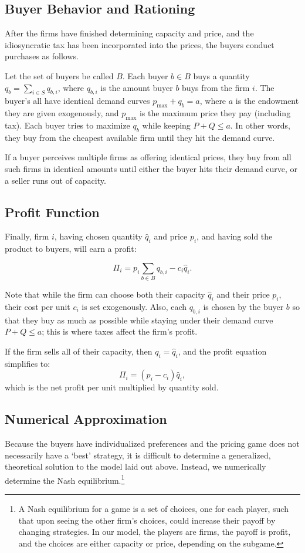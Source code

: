 \documentclass[11pt]{article}
\begin{document}
\subsection{Buyer Behavior and Rationing}
After the firms have finished determining capacity and price, and the
idiosyncratic tax has been incorporated into the prices, the buyers conduct
purchases as follows.

Let the set of buyers be called $B$. Each buyer $b\in B$ buys a quantity $q_b =
\sum_{i\in S} q_{b,i}$, where $q_{b,i}$ is the amount buyer $b$ buys from the
firm $i$. The buyer's all have identical demand curves $p_\text{max} + q_b =
a$, where $a$ is the endowment they are given exogenously, and $p_\text{max}$
is the maximum price they pay (including tax). Each buyer tries to maximize
$q_b$ while keeping $P + Q \le a$. In other words, they buy from the cheapest
available firm until they hit the demand curve.

If a buyer perceives multiple firms as offering identical prices, they buy from
all such firms in identical amounts until either the buyer hits their demand
curve, or a seller runs out of capacity. 

\subsection{Profit Function}
Finally, firm $i$, having chosen quantity $\hat q_i$ and price $p_i$, and
having sold the product to buyers, will earn a profit:

\begin{equation}
    \Pi_i = p_i\sum_{b\in B} q_{b,i} - c_i\hat q_i.
\end{equation}

Note that while the firm can choose both their capacity $\hat q_i$ and their
price $p_i$, their cost per unit $c_i$ is set exogenously. Also, each $q_{b,i}$
is chosen by the buyer $b$ so that they buy as much as possible while staying
under their demand curve $P+Q\leq a$; this is where taxes affect the firm's
profit.

If the firm sells all of their capacity, then $q_i = \hat q_i$, and the profit
equation simplifies to:
\begin{equation}
    \Pi_i = (p_i- c_i)\hat q_i,
\end{equation}
which is the net profit per unit multiplied by quantity sold.

\subsection{Numerical Approximation}
Because the buyers have individualized preferences and the pricing game does
not necessarily have a `best' strategy, it is difficult to determine a
generalized, theoretical solution to the model laid out above. Instead, we
numerically determine the Nash equilibrium.\footnote{A Nash equilibrium
for a game is a set of choices, one for each player, such that upon seeing the
other firm's choices, could increase their payoff by changing strategies. In
our model, the players are firms, the payoff is profit, and the choices are
either capacity or price, depending on the subgame.}
\end{document}
